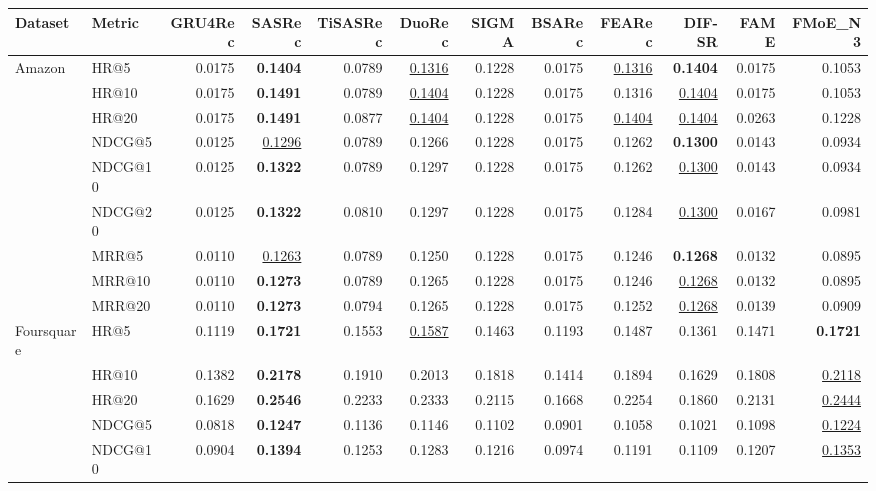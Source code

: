 \begin{tabular}{llrrrrrrrrrr}
\hline
Dataset & Metric & GRU4Rec & SASRec & TiSASRec & DuoRec & SIGMA & BSARec & FEARec & DIF-SR & FAME & FMoE\_N3 \\
\hline
Amazon & HR@5 & 0.0175 & \textbf{0.1404} & 0.0789 & \underline{0.1316} & 0.1228 & 0.0175 & \underline{0.1316} & \textbf{0.1404} & 0.0175 & 0.1053 \\
 & HR@10 & 0.0175 & \textbf{0.1491} & 0.0789 & \underline{0.1404} & 0.1228 & 0.0175 & 0.1316 & \underline{0.1404} & 0.0175 & 0.1053 \\
 & HR@20 & 0.0175 & \textbf{0.1491} & 0.0877 & \underline{0.1404} & 0.1228 & 0.0175 & \underline{0.1404} & \underline{0.1404} & 0.0263 & 0.1228 \\
 & NDCG@5 & 0.0125 & \underline{0.1296} & 0.0789 & 0.1266 & 0.1228 & 0.0175 & 0.1262 & \textbf{0.1300} & 0.0143 & 0.0934 \\
 & NDCG@10 & 0.0125 & \textbf{0.1322} & 0.0789 & 0.1297 & 0.1228 & 0.0175 & 0.1262 & \underline{0.1300} & 0.0143 & 0.0934 \\
 & NDCG@20 & 0.0125 & \textbf{0.1322} & 0.0810 & 0.1297 & 0.1228 & 0.0175 & 0.1284 & \underline{0.1300} & 0.0167 & 0.0981 \\
 & MRR@5 & 0.0110 & \underline{0.1263} & 0.0789 & 0.1250 & 0.1228 & 0.0175 & 0.1246 & \textbf{0.1268} & 0.0132 & 0.0895 \\
 & MRR@10 & 0.0110 & \textbf{0.1273} & 0.0789 & 0.1265 & 0.1228 & 0.0175 & 0.1246 & \underline{0.1268} & 0.0132 & 0.0895 \\
 & MRR@20 & 0.0110 & \textbf{0.1273} & 0.0794 & 0.1265 & 0.1228 & 0.0175 & 0.1252 & \underline{0.1268} & 0.0139 & 0.0909 \\
\hline
Foursquare & HR@5 & 0.1119 & \textbf{0.1721} & 0.1553 & \underline{0.1587} & 0.1463 & 0.1193 & 0.1487 & 0.1361 & 0.1471 & \textbf{0.1721} \\
 & HR@10 & 0.1382 & \textbf{0.2178} & 0.1910 & 0.2013 & 0.1818 & 0.1414 & 0.1894 & 0.1629 & 0.1808 & \underline{0.2118} \\
 & HR@20 & 0.1629 & \textbf{0.2546} & 0.2233 & 0.2333 & 0.2115 & 0.1668 & 0.2254 & 0.1860 & 0.2131 & \underline{0.2444} \\
 & NDCG@5 & 0.0818 & \textbf{0.1247} & 0.1136 & 0.1146 & 0.1102 & 0.0901 & 0.1058 & 0.1021 & 0.1098 & \underline{0.1224} \\
 & NDCG@10 & 0.0904 & \textbf{0.1394} & 0.1253 & 0.1283 & 0.1216 & 0.0974 & 0.1191 & 0.1109 & 0.1207 & \underline{0.1353} \\

\end{tabular}
